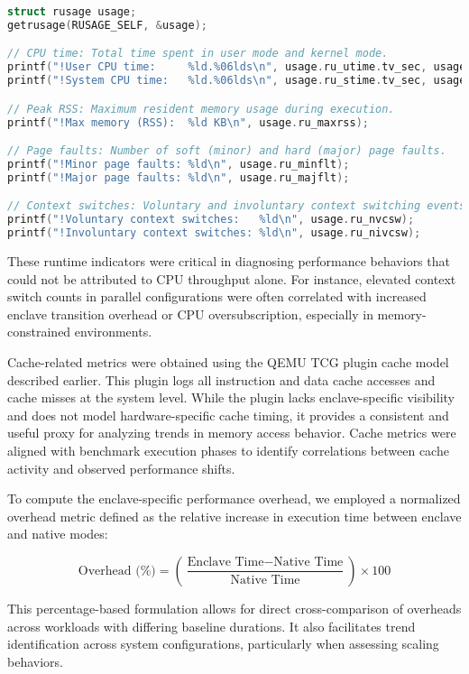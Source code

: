 \begin{lstlisting}[language=C, caption={In-enclave system-level instrumentation using \texttt{getrusage()}}, label={lst:getrusage}]
struct rusage usage;
getrusage(RUSAGE_SELF, &usage);

// CPU time: Total time spent in user mode and kernel mode.
printf("!User CPU time:     %ld.%06lds\n", usage.ru_utime.tv_sec, usage.ru_utime.tv_usec);
printf("!System CPU time:   %ld.%06lds\n", usage.ru_stime.tv_sec, usage.ru_stime.tv_usec);

// Peak RSS: Maximum resident memory usage during execution.
printf("!Max memory (RSS):  %ld KB\n", usage.ru_maxrss);

// Page faults: Number of soft (minor) and hard (major) page faults.
printf("!Minor page faults: %ld\n", usage.ru_minflt);
printf("!Major page faults: %ld\n", usage.ru_majflt);

// Context switches: Voluntary and involuntary context switching events.
printf("!Voluntary context switches:   %ld\n", usage.ru_nvcsw);
printf("!Involuntary context switches: %ld\n", usage.ru_nivcsw);
\end{lstlisting}

These runtime indicators were critical in diagnosing performance behaviors that could not be attributed to CPU throughput alone. For instance, elevated context switch counts in parallel configurations were often correlated with increased enclave transition overhead or CPU oversubscription, especially in memory-constrained environments.

Cache-related metrics were obtained using the QEMU TCG plugin cache model described earlier. This plugin logs all instruction and data cache accesses and cache misses at the system level. While the plugin lacks enclave-specific visibility and does not model hardware-specific cache timing, it provides a consistent and useful proxy for analyzing trends in memory access behavior. Cache metrics were aligned with benchmark execution phases to identify correlations between cache activity and observed performance shifts.

To compute the enclave-specific performance overhead, we employed a normalized overhead metric defined as the relative increase in execution time between enclave and native modes:

\[
\text{Overhead (\%)} = \left( \frac{\text{Enclave Time} - \text{Native Time}}{\text{Native Time}} \right) \times 100
\]

This percentage-based formulation allows for direct cross-comparison of overheads across workloads with differing baseline durations. It also facilitates trend identification across system configurations, particularly when assessing scaling behaviors.

